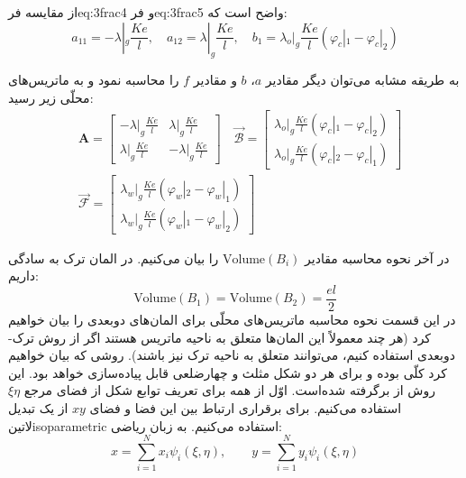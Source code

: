 از مقایسه ‌فر{eq:3frac4} و ‌فر{eq:3frac5} واضح است که:
\begin{equation}
\label{eq:3frac6}
a_{11} =-\lambda|_g\frac{Ke}{l}, \quad
a_{12} = \lambda|_g\frac{Ke}{l}, \quad
b_1 = \lambda_o|_g \frac{Ke}{l}(\varphi_c|_1 - \varphi_c|_2)
\end{equation}

به طریقه مشابه می‌توان دیگر مقادیر 
$a$، $b$ و مقادیر $f$
را محاسبه نمود و به ماتریس‌های محلّی زیر رسید:
\begin{equation}
\label{eq:3frac7}
\begin{aligned}
&\mathbf A =
	 \begin{bmatrix}
	-\lambda|_g\frac{Ke}{l} &\lambda|_g\frac{Ke}{l}\\
	\lambda|_g\frac{Ke}{l} &-\lambda|_g\frac{Ke}{l} 
	  \end{bmatrix} \quad
\vec{\mathcal B} = 
	\begin{bmatrix}
	\lambda_o|_g \frac{Ke}{l}(\varphi_c|_1 - \varphi_c|_2) \\
	\lambda_o|_g \frac{Ke}{l}(\varphi_c|_2 - \varphi_c|_1)
	\end{bmatrix} \\
&\vec{\mathcal F} = 
	\begin{bmatrix}
	\lambda_w|_g \frac{Ke}{l}(\varphi_w|_2 - \varphi_w|_1) \\
	\lambda_w|_g \frac{Ke}{l}(\varphi_w|_1 - \varphi_w|_2)
	\end{bmatrix}
\end{aligned}
\end{equation}

در آخر نحوه محاسبه مقادیر 
$\text{Volume}(B_i)$
را بیان می‌کنیم. در المان ترک به سادگی داریم:
\begin{equation}
\label{eq:3frac8}
\text{Volume}(B_1) = \text{Volume}(B_2) = \frac{el}{2}
\end{equation}
در این قسمت نحوه محاسبه ماتریس‌های محلّی برای المان‌های دو‌بعدی را بیان خواهیم کرد (هر چند معمولاً این المان‌ها متعلق به ناحیه ماتریس هستند اگر از روش ترک-دوبعدی استفاده کنیم، می‌توانند متعلق به ناحیه ترک نیز باشند). روشی که بیان خواهیم کرد کلّی بوده و برای هر دو شکل مثلث و چهارضلعی قابل پیاده‌سازی خواهد بود. این روش از  برگرفته شده‌است. اوّل از همه برای تعریف توابع شکل از فضای مرجع $\xi \eta$ استفاده می‌کنیم. برای برقراری ارتباط بین این فضا و فضای $xy$ از یک تبدیل ‌لاتین{isoparametric} استفاده می‌کنیم. به زبان ریاضی:
\begin{equation}
\label{eq:3poly1}
x= \sum_{i=1}^{N} x_i\psi_i(\xi,\eta), \qquad y= \sum_{i=1}^{N} y_i\psi_i(\xi,\eta)
\end{equation}

